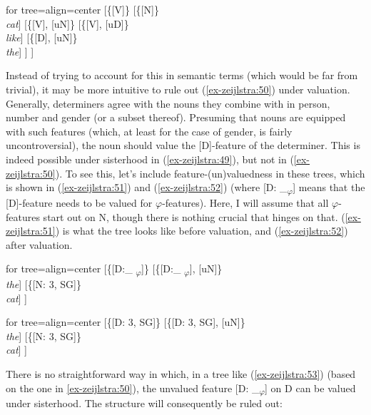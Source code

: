 \documentclass[output=paper
,modfonts
,nonflat]{langsci/langscibook}
\begin{document}
\ea\label{ex-zeijlstra:50}
			\begin{forest}	for tree={align=center}
				[\{{[}V{]}\}
				[\{{[}N{]}\}\\ \textit{cat}]
				[\{{[}V{]}{,} {[}uN{]}\}
				[\{{[}V{]}{,} {[}uD{]}\}\\ \textit{like}]
				[\{{[}D{]}{,} {[}uN{]}\}\\ \textit{the}]
				] ] 
		\end{forest}\z
\noindent Instead of trying to account for this in semantic terms (which would be far from trivial), it may be more intuitive to rule out (\ref{ex-zeijlstra:50}) under valuation. Generally, determiners agree with the nouns they combine with in person, number and gender (or a subset thereof). Presuming that nouns are equipped with such features (which, at least for the case of gender, is fairly uncontroversial), the noun should value the [D]-feature of the determiner. This is indeed possible under sisterhood in (\ref{ex-zeijlstra:49}), but not in (\ref{ex-zeijlstra:50}). To see this, let’s include feature-(un)valuedness in these trees, which is shown in (\ref{ex-zeijlstra:51}) and (\ref{ex-zeijlstra:52}) (where [D: \_\textsubscript{$\varphi$}] means that the [D]-feature needs to be valued for $\varphi$-features). Here, I will assume that all $\varphi$-features start out on N, though there is nothing crucial that hinges on that. (\ref{ex-zeijlstra:51}) is what the tree looks like before valuation, and (\ref{ex-zeijlstra:52}) after valuation.

\begin{exe}
\ex \label{ex-zeijlstra:51}
			\begin{forest}	for tree={align=center}
				[\{{[}D:\_ \textsubscript{$\varphi$}{]}\}
				[\{{[}D:\_ \textsubscript{$\varphi$}{]}{,} {[}uN{]}\}\\ \textit{the}]
				[\{{[}N: 3{,} SG{]}\}\\ \textit{cat}]
				]  
		\end{forest}
\ex\label{ex-zeijlstra:52}
			\begin{forest}	for tree={align=center}
				[\{{[}D: 3{,} SG{]}\}
				[\{{[}D: 3{,} SG{]}{,} {[}uN{]}\}\\ \textit{the}]
				[\{{[}N: 3{,} SG{]}\}\\ \textit{cat}]
				]  
		\end{forest}
\end{exe}

\noindent There is no straightforward way in which, in a tree like (\ref{ex-zeijlstra:53}) (based on the one in \ref{ex-zeijlstra:50}), the unvalued feature [D: \_\textsubscript{$\varphi$}] on D can be valued under sisterhood. The structure will consequently be ruled out:
\end{document}
